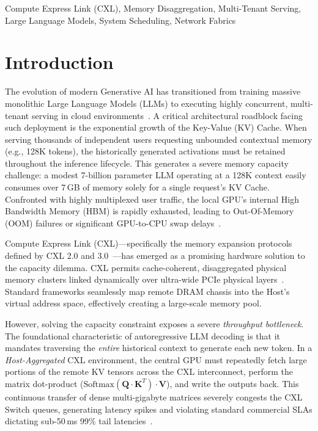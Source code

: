 \documentclass[10pt,conference]{IEEEtran}
\begin{document}
\begin{IEEEkeywords}
Compute Express Link (CXL), Memory Disaggregation, Multi-Tenant Serving, Large Language Models, System Scheduling, Network Fabrics
\end{IEEEkeywords}

\section{Introduction}

The evolution of modern Generative AI has transitioned from training massive monolithic Large Language Models (LLMs) to executing highly concurrent, multi-tenant serving in cloud environments~\cite{orca, deepspeed_inf}. A critical architectural roadblock facing such deployment is the exponential growth of the Key-Value (KV) Cache. When serving thousands of independent users requesting unbounded contextual memory (e.g., 128K tokens), the historically generated activations must be retained throughout the inference lifecycle. This generates a severe memory capacity challenge: a modest 7-billion parameter LLM operating at a 128K context easily consumes over 7\,GB of memory solely for a single request's KV Cache. Confronted with highly multiplexed user traffic, the local GPU's internal High Bandwidth Memory (HBM) is rapidly exhausted, leading to Out-Of-Memory (OOM) failures or significant GPU-to-CPU swap delays~\cite{vllm, flexgen}.

Compute Express Link (CXL)---specifically the memory expansion protocols defined by CXL 2.0 and 3.0~\cite{cxl_spec}---has emerged as a promising hardware solution to the capacity dilemma. CXL permits cache-coherent, disaggregated physical memory clusters linked dynamically over ultra-wide PCIe physical layers~\cite{cxl_pond, directcxl}. Standard frameworks seamlessly map remote DRAM chassis into the Host's virtual address space, effectively creating a large-scale memory pool. 

However, solving the capacity constraint exposes a severe \textit{throughput bottleneck}. The foundational characteristic of autoregressive LLM decoding is that it mandates traversing the \textit{entire} historical context to generate each new token. In a \textit{Host-Aggregated} CXL environment, the central GPU must repeatedly fetch large portions of the remote KV tensors across the CXL interconnect, perform the matrix dot-product ($\text{Softmax}(\mathbf{Q} \cdot \mathbf{K}^T) \cdot \mathbf{V}$), and write the outputs back. This continuous transfer of dense multi-gigabyte matrices severely congests the CXL Switch queues, generating latency spikes and violating standard commercial SLAs dictating sub-50\,ms 99\% tail latencies~\cite{distserve, splitwise}.
\end{document}

